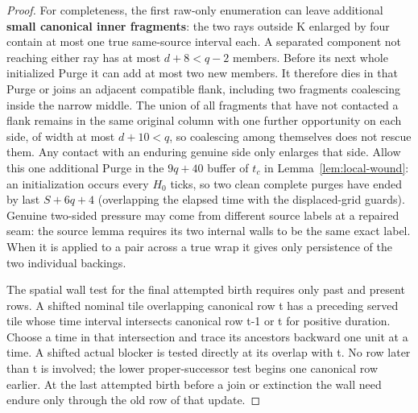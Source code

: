 \begin{proof}
For completeness, the first raw-only enumeration can leave additional \textbf{small canonical inner fragments}: the two rays outside K enlarged by four contain at most one true same-source interval each. A separated component not reaching either ray has at most \(d+8<q-2\) members. Before its next whole initialized Purge it can add at most two new members. It therefore dies in that Purge or joins an adjacent compatible flank, including two fragments coalescing inside the narrow middle. The union of all fragments that have not contacted a flank remains in the same original column with one further opportunity on each side, of width at most \(d+10<q\), so coalescing among themselves does not rescue them. Any contact with an enduring genuine side only enlarges that side. Allow this one additional Purge in the \(9q+40\) buffer of \(t_c\) in Lemma~\ref{lem:local-wound}: an initialization occurs every \(H_0\) ticks, so two clean complete purges have ended by last \(S+6q+4\) (overlapping the elapsed time with the displaced-grid guards). Genuine two-sided pressure may come from different source labels at a repaired seam: the source lemma requires its two internal walls to be the same exact label. When it is applied to a pair across a true wrap it gives only persistence of the two individual backings.

The spatial wall test for the final attempted birth requires only past and present rows. A shifted nominal tile overlapping canonical row t has a preceding served tile whose time interval intersects canonical row t-1 or t for positive duration. Choose a time in that intersection and trace its ancestors backward one unit at a time. A shifted actual blocker is tested directly at its overlap with t. No row later than t is involved; the lower proper-successor test begins one canonical row earlier. At the last attempted birth before a join or extinction the wall need endure only through the old row of that update.
\end{proof}

